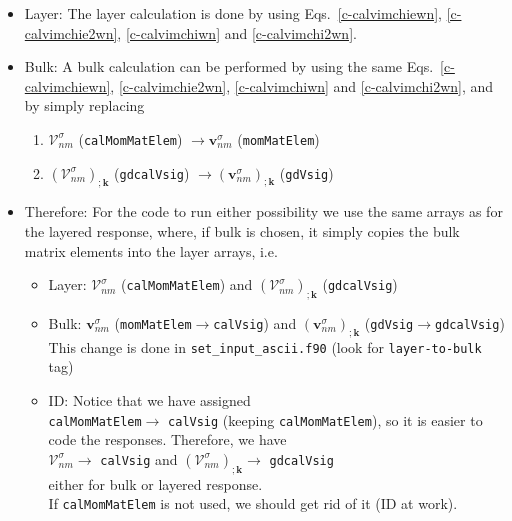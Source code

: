 \begin{itemize}
\item Layer: The layer calculation is done by using
Eqs.~\eqref{c-calvimchiewn}, \eqref{c-calvimchie2wn}, \eqref{c-calvimchiwn}
 and \eqref{c-calvimchi2wn}. 
\item Bulk:
A bulk calculation can be performed by using the same
Eqs.~\eqref{c-calvimchiewn}, \eqref{c-calvimchie2wn}, \eqref{c-calvimchiwn}
 and \eqref{c-calvimchi2wn}, and by simply replacing
\begin{enumerate}
\item $\boldsymbol{\mathcal{V}}^\sigma_{nm}$ (\verb=calMomMatElem=) $\to \mathbf{v}^\sigma_{nm}$ (\verb=momMatElem=) 
\item $(\boldsymbol{\mathcal{V}}^\sigma_{nm})_{;\mathbf{k}}$ (\verb=gdcalVsig=) $\to
  (\mathbf{v}^\sigma_{nm})_{;\mathbf{k}}$ (\verb=gdVsig=) 
\end{enumerate}
\item Therefore: For the code to run either possibility we use the
  same arrays as for the layered response, where, if bulk is chosen, it
  simply copies the bulk matrix elements into the layer arrays, i.e.
\begin{itemize}
\item Layer: 
$\boldsymbol{\mathcal{V}}^\sigma_{nm}$ (\verb=calMomMatElem=) and
$(\boldsymbol{\mathcal{V}}^\sigma_{nm})_{;\mathbf{k}}$ (\verb=gdcalVsig=) 
\item Bulk:
$\mathbf{v}^\sigma_{nm}$ (\verb=momMatElem=$\to$\verb=calVsig=) and
$(\mathbf{v}^\sigma_{nm})_{;\mathbf{k}}$ (\verb=gdVsig=$\to$\verb=gdcalVsig=) \\
This change is done in \verb=set_input_ascii.f90= (look for
\verb=layer-to-bulk= tag)
\item ID: Notice that we have assigned\\
  \verb=calMomMatElem=$\to$ \verb=calVsig= (keeping
  \verb=calMomMatElem=), so it is easier to  code the responses.
Therefore, we have\\
$\boldsymbol{\mathcal{V}}^\sigma_{nm}\to$ \verb=calVsig= and
$(\boldsymbol{\mathcal{V}}^\sigma_{nm})_{;\mathbf{k}}\to$ \verb=gdcalVsig=\\
either for bulk or layered response. \\
If \verb=calMomMatElem= is not used, we should get rid of it (ID at work).
\end{itemize}
\end{itemize}



